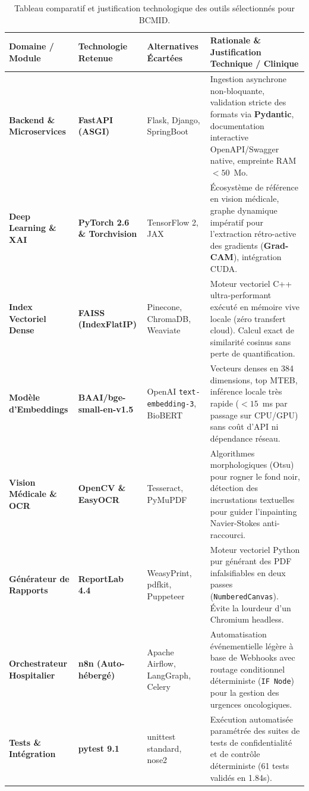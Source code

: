 \documentclass[11pt,a4paper]{article}
\begin{document}
\begin{table}[htbp]
\centering
\footnotesize
\renewcommand{\arraystretch}{1.2}
\caption{Tableau comparatif et justification technologique des outils sélectionnés pour BCMID.}
\label{tab:tools_justification}
\begin{tabularx}{\linewidth}{|p{2.8cm}|p{2.6cm}|p{2.6cm}|X|}
\hline
\rowcolor{LightBlueBg}
\textbf{Domaine / Module} & \textbf{Technologie Retenue} & \textbf{Alternatives Écartées} & \textbf{Rationale \& Justification Technique / Clinique} \\
\hline
\textbf{Backend \& Microservices} & \textbf{FastAPI (ASGI)} & Flask, Django, SpringBoot & Ingestion asynchrone non-bloquante, validation stricte des formats via \textbf{Pydantic}, documentation interactive OpenAPI/Swagger native, empreinte RAM $<50$~Mo. \\
\hline
\textbf{Deep Learning \& XAI} & \textbf{PyTorch 2.6 \& Torchvision} & TensorFlow 2, JAX & Écosystème de référence en vision médicale, graphe dynamique impératif pour l'extraction rétro-active des gradients (\textbf{Grad-CAM}), intégration CUDA. \\
\hline
\textbf{Index Vectoriel Dense} & \textbf{FAISS (IndexFlatIP)} & Pinecone, ChromaDB, Weaviate & Moteur vectoriel C++ ultra-performant exécuté en mémoire vive locale (zéro transfert cloud). Calcul exact de similarité cosinus sans perte de quantification. \\
\hline
\textbf{Modèle d'Embeddings} & \textbf{BAAI/bge-small-en-v1.5} & OpenAI \texttt{text-embedding-3}, BioBERT & Vecteurs denses en 384 dimensions, top MTEB, inférence locale très rapide ($<15$~ms par passage sur CPU/GPU) sans coût d'API ni dépendance réseau. \\
\hline
\textbf{Vision Médicale \& OCR} & \textbf{OpenCV \& EasyOCR} & Tesseract, PyMuPDF & Algorithmes morphologiques (Otsu) pour rogner le fond noir, détection des incrustations textuelles pour guider l'inpainting Navier-Stokes anti-raccourci. \\
\hline
\textbf{Générateur de Rapports} & \textbf{ReportLab 4.4} & WeasyPrint, pdfkit, Puppeteer & Moteur vectoriel Python pur générant des PDF infalsifiables en deux passes (\texttt{NumberedCanvas}). Évite la lourdeur d'un Chromium headless. \\
\hline
\textbf{Orchestrateur Hospitalier} & \textbf{n8n (Auto-hébergé)} & Apache Airflow, LangGraph, Celery & Automatisation événementielle légère à base de Webhooks avec routage conditionnel déterministe (\texttt{IF Node}) pour la gestion des urgences oncologiques. \\
\hline
\textbf{Tests \& Intégration} & \textbf{pytest 9.1} & unittest standard, nose2 & Exécution automatisée paramétrée des suites de tests de confidentialité et de contrôle déterministe (61 tests validés en 1.84s). \\
\hline
\end{tabularx}
\end{table}
\end{document}
